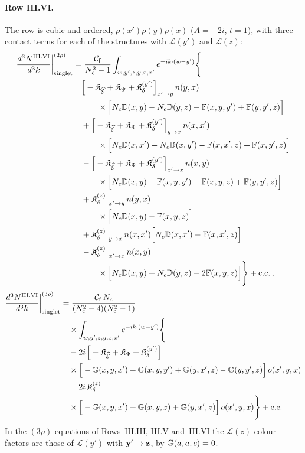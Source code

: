 \paragraph{Row III.VI.} The row is cubic and ordered, $\rho(x')\rho(y)\rho(x)$ ($A=-2i$, $t=1$), with three contact terms for each of the structures with $\mathcal L(y')$ and $\mathcal L(z)$:
\begin{align}\label{eq:sIIIVI}
\frac{d^3N^{\rm III.VI}}{d^3k}\bigg|^{(2\rho)}_{\rm singlet}&=\frac{\mathcal C_{\rm f}}{N_c^2-1}\int_{w,y',z,y,x,x'}e^{-ik\cdot(w-y')}\Bigg\{\notag\\
&\quad\Big[-\mathfrak K_{\widehat{\mathcal E}}+\mathfrak K_\Psi+\mathfrak K_\delta^{(y')}\Big]_{x'\to y}\,n(y,x)\notag\\
&\qquad\quad\times\Big[N_c\mathbb{D}(x,y)-N_c\mathbb{D}(y,z)-\mathbb{F}(x,y,y')+\mathbb{F}(y,y',z)\Big]\notag\\
&\quad+\Big[-\mathfrak K_{\widehat{\mathcal E}}+\mathfrak K_\Psi+\mathfrak K_\delta^{(y')}\Big]_{y\to x}\,n(x,x')\notag\\
&\qquad\quad\times\Big[N_c\mathbb{D}(x,x')-N_c\mathbb{D}(x,y')-\mathbb{F}(x,x',z)+\mathbb{F}(x,y',z)\Big]\notag\\
&\quad-\Big[-\mathfrak K_{\widehat{\mathcal E}}+\mathfrak K_\Psi+\mathfrak K_\delta^{(y')}\Big]_{x'\to x}\,n(x,y)\notag\\
&\qquad\quad\times\Big[N_c\mathbb{D}(x,y)-\mathbb{F}(x,y,y')-\mathbb{F}(x,y,z)+\mathbb{F}(y,y',z)\Big]\notag\\
&\quad+\mathfrak K_\delta^{(z)}\big|_{x'\to y}\,n(y,x)\notag\\
&\qquad\quad\times\Big[N_c\mathbb{D}(x,y)-\mathbb{F}(x,y,z)\Big]\notag\\
&\quad+\mathfrak K_\delta^{(z)}\big|_{y\to x}\,n(x,x')\Big[N_c\mathbb{D}(x,x')-\mathbb{F}(x,x',z)\Big]\notag\\
&\quad-\mathfrak K_\delta^{(z)}\big|_{x'\to x}\,n(x,y)\notag\\
&\qquad\quad\times\Big[N_c\mathbb{D}(x,y)+N_c\mathbb{D}(y,z)-2\mathbb{F}(x,y,z)\Big]\Bigg\}+{\rm c.c.}\,,
\end{align}
\begin{align}\label{eq:oIIIVI}
\frac{d^3N^{\rm III.VI}}{d^3k}\bigg|^{(3\rho)}_{\rm singlet}&=\frac{\mathcal C_{\rm f}\,N_c}{(N_c^2-4)(N_c^2-1)}\notag\\
&\quad\times\int_{w,y',z,y,x,x'}e^{-ik\cdot(w-y')}\Bigg\{\notag\\
&\quad-2i\,\Big[-\mathfrak K_{\widehat{\mathcal E}}+\mathfrak K_\Psi+\mathfrak K_\delta^{(y')}\Big]\notag\\
&\quad\times\Big[-\mathbb{G}(x,y,x')+\mathbb{G}(x,y,y')+\mathbb{G}(y,x',z)-\mathbb{G}(y,y',z)\Big]\,o(x',y,x)\notag\\
&\quad-2i\,\mathfrak K_\delta^{(z)}\notag\\
&\quad\times\Big[-\mathbb{G}(x,y,x')+\mathbb{G}(x,y,z)+\mathbb{G}(y,x',z)\Big]\,o(x',y,x)\Bigg\}+{\rm c.c.}
\end{align}
In the $(3\rho)$ equations of Rows~III.III, III.V and~III.VI the $\mathcal L(z)$ colour factors are those of $\mathcal L(y')$ with $\mathbf{y}'\to\mathbf{z}$, by $\mathbb{G}(a,a,c)=0$.

